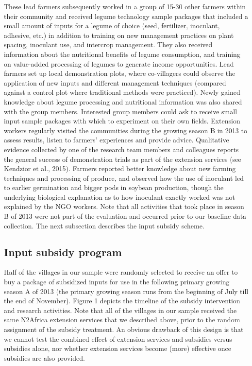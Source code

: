 These lead farmers subsequently worked in a group of 15-30 other farmers within their community and received legume technology sample packages that included a small amount of inputs for a legume of choice (seed, fertilizer, inoculant, adhesive, etc.) in addition to training on new management practices on plant spacing, inoculant use, and intercrop management. They also received information about the nutritional benefits of legume consumption, and training on value-added processing of legumes to generate income opportunities. 
Lead farmers set up local demonstration plots, where co-villagers could observe the application of new inputs and different management techniques (compared against a control plot where traditional methods were practiced). Newly gained knowledge about legume processing and nutritional information was also shared with the group members. Interested group members could ask to receive small input sample packages with which to experiment on their own fields. Extension workers regularly visited the communities during the growing season B in 2013 to assess results, listen to farmers’ experiences and provide advice. Qualitative evidence collected by one of the research team members and colleagues reports the general success of demonstration trials as part of the extension services (see Kendzior et al., 2015). Farmers reported better knowledge about new farming techniques and processing of produce, and observed how the use of inoculant led to earlier germination and bigger pods in soybean production, though the underlying biological explanation as to how inoculant exactly worked was not explained by the NGO workers. Note that all activities that took place in season B of 2013 were not part of the evaluation and occurred prior to our baseline data collection. The next subsection describes the input subsidy scheme.

\subsection{Input subsidy program} 
Half of the villages in our sample were randomly selected to receive an offer to buy a package of subsidized inputs for use in the following primary growing season A of 2013 (the primary growing season runs from the beginning of July till the end of November). Figure 1 depicts the timeline of the subsidy intervention and research activities. Note that all of the villages in our sample received the same N2Africa extension services that we described above, prior to the random assignment of the subsidy treatment. An obvious drawback of this design is that we cannot test the combined effect of extension services and subsidies versus subsidies alone, nor whether extension services become (more) effective once subsidies are also provided.

